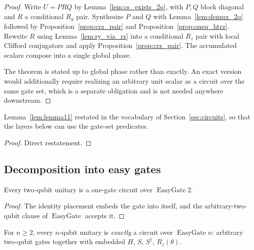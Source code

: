 \begin{proof}
  \leanok
  Write $U = P R Q$ by Lemma~\ref{lem:cs_exists_2q}, with $P,Q$ block diagonal
  and $R$ a conditional $R_y$ pair.  Synthesize $P$ and $Q$ with
  Lemma~\ref{lem:demux_2q} followed by Proposition~\ref{prop:crz_pair} and
  Proposition~\ref{prop:oneq_htrz}.  Rewrite $R$ using
  Lemma~\ref{lem:ry_via_rz} into a conditional $R_z$ pair with local Clifford
  conjugators and apply Proposition~\ref{prop:crz_pair}.  The accumulated
  scalars compose into a single global phase.

  The theorem is stated up to global phase rather than exactly.  An exact
  version would additionally require realizing an arbitrary unit scalar as a
  circuit over the same gate set, which is a separate obligation and is not
  needed anywhere downstream.
\end{proof}

\begin{lemma}
  \label{lem:2q_clifford_rz}
  \leanok
  Lemma~\ref{lem:lemma11} restated in the vocabulary of
  Section~\ref{sec:circuits}, so that the layers below can use the gate-set
  predicates.
\end{lemma}

\begin{proof}
  \leanok
  Direct restatement.
\end{proof}

\subsection{Decomposition into easy gates}

\begin{lemma}
  \label{lem:easy_2q}
  \leanok
  Every two-qubit unitary is a one-gate circuit over $\operatorname{EasyGate} 2$.
\end{lemma}

\begin{proof}
  \leanok
  The identity placement embeds the gate into itself, and the
  arbitrary-two-qubit clause of $\operatorname{EasyGate}$ accepts it.
\end{proof}

\begin{lemma}
  \label{lem:lemma1_easy}
  \leanok
  For $n \ge 2$, every $n$-qubit unitary is \emph{exactly} a circuit over
  $\operatorname{EasyGate} n$: arbitrary two-qubit gates together with embedded
  $H$, $S$, $S^\dagger$, $R_z(\theta)$.
\end{lemma}

